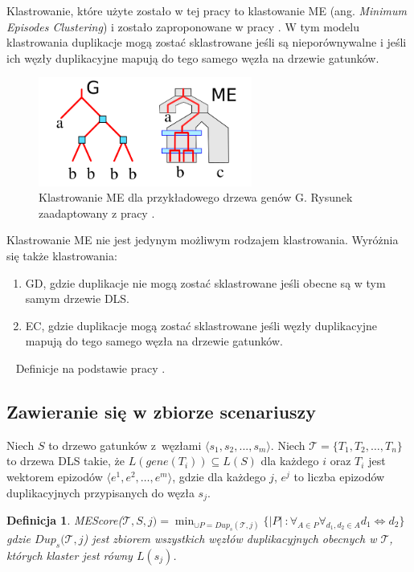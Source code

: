 \documentclass[licencjacka]{pracamgr}
\newtheorem{defi}{Definicja}[section]
\begin{document}
Klastrowanie, które użyte zostało w tej pracy to klastowanie ME (ang. \textit{Minimum Episodes Clustering}) i zostało zaproponowane w pracy \cite{guigo}. W tym modelu klastrowania duplikacje mogą zostać sklastrowane jeśli są nieporównywalne i jeśli ich węzły duplikacyjne mapują do tego samego węzła na drzewie gatunków.

\begin{figure}[H]
  \centering
  \includegraphics[width=70mm]{./pictures/clas_type_me.png}
  \caption{Klastrowanie ME dla przykładowego drzewa genów G. Rysunek zaadaptowany z pracy \cite{pasz}.}
\end{figure}


Klastrowanie ME nie jest jedynym możliwym rodzajem klastrowania. Wyróżnia się także klastrowania:
\begin{enumerate}
\item GD, gdzie duplikacje nie mogą zostać sklastrowane jeśli obecne są w tym samym drzewie DLS.
\item EC, gdzie duplikacje mogą zostać sklastrowane jeśli węzły duplikacyjne mapują do tego samego węzła na drzewie gatunków.
\end{enumerate}
~\linebreak
Definicje na podstawie pracy \cite{pasz}.

\subsection{Zawieranie się w zbiorze scenariuszy}
Niech $S$ to drzewo gatunków z~węzłami $\langle s_1,s_2, ... , s_m \rangle$.
Niech $\mathcal{T}=\{T_1,T_2, \dots , T_n\}$ to drzewa DLS takie, że $L(gene(T_i)) \subseteq L(S)$ dla każdego $i$ oraz $T_i$ jest wektorem epizodów $\langle e^1,e^2, \dots , e^m \rangle$, gdzie dla każdego $j$, $e^j$ to liczba epizodów duplikacyjnych przypisanych do węzła $s_j$.

\begin{defi}\label{MEs}
  MEScore($\mathcal{T}, S, j) = \min_{\cup P = {Dup}_s(\mathcal{T},j)} \lbrace \vert P \vert\ : \forall_{A \in P} \forall_{d_1,d_2 \in A} d_1 \Longleftrightarrow d_2 \rbrace$
 gdzie ${Dup}_s(\mathcal{T},j$) jest zbiorem wszystkich węzłów duplikacyjnych obecnych w $\mathcal{T}$, których klaster jest równy $L(s_j)$. 
\end{defi}
\end{document}

